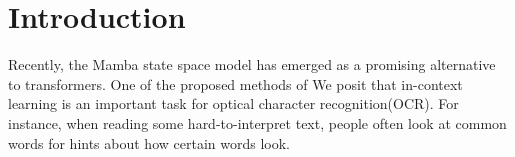 \section{Introduction}
Recently, the Mamba state space model has emerged as a promising alternative to
transformers\cite{mamba}. One of the proposed methods of 
We posit that in-context learning is an important task for optical character
recognition(OCR).
For instance, when reading some hard-to-interpret text, people often look at
common words for hints about how certain words look.


